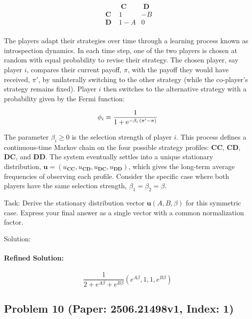 \documentclass[10pt]{article}
\begin{document}
\begin{equation*}
	\begin{array}{c|cc}
		&\mathbf{\;C\;} &\mathbf{\;D\;}\\
		\hline
		\mathbf{\;C\;} &1 &-B \\
		\mathbf{\;D\;} &1-A &0 \\
	\end{array}
\end{equation*}

The players adapt their strategies over time through a learning process known as introspection dynamics. In each time step, one of the two players is chosen at random with equal probability to revise their strategy. The chosen player, say player $i$, compares their current payoff, $\pi$, with the payoff they would have received, $\pi'$, by unilaterally switching to the other strategy (while the co-player's strategy remains fixed). Player $i$ then switches to the alternative strategy with a probability given by the Fermi function:

\begin{equation*}
	\phi_i = \frac{1}{1+{\rm e}^{-\beta_i\, (\pi' - \pi)}}
\end{equation*}

The parameter $\beta_i \ge 0$ is the selection strength of player $i$. This process defines a continuous-time Markov chain on the four possible strategy profiles: $\mathbf{CC}$, $\mathbf{CD}$, $\mathbf{DC}$, and $\mathbf{DD}$. The system eventually settles into a unique stationary distribution, $\mathbf{u} = (u_{\mathbf{CC}}, u_{\mathbf{CD}}, u_{\mathbf{DC}}, u_{\mathbf{DD}})$, which gives the long-term average frequencies of observing each profile. Consider the specific case where both players have the same selection strength, $\beta_1 = \beta_2 = \beta$.

Task:
Derive the stationary distribution vector $\mathbf{u}(A, B, \beta)$ for this symmetric case. Express your final answer as a single vector with a common normalization factor.

Solution:

\paragraph*{Refined Solution:}
\[ \frac{1}{2 + e^{A \beta} + e^{B \beta}}(e^{A \beta},1,1,e^{B \beta}) \]

\newpage
\subsection*{Problem 10 (Paper: 2506.21498v1, Index: 1)}
\end{document}
